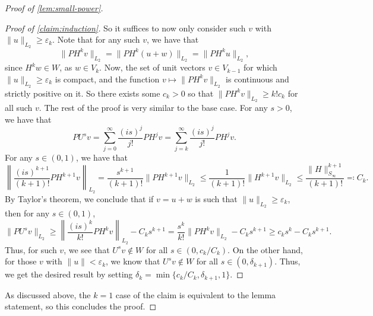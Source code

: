 \documentclass[11pt]{article}
\theoremstyle{plain}
\numberwithin{equation}{section}
\theoremstyle{definition}
\newcommand{\bnorm}[1]{\left\lVert#1\right\rVert}
\newcommand{\norm}[1]{\lVert#1\rVert}
\begin{document}
\begin{proof}[Proof of \cref{lem:small-power}]
\begin{proof}[Proof of \cref{claim:induction}]
        So it suffices to now only consider such $v$ with $\norm u_{L_2} \geq \varepsilon_k$. Note that for any such $v$, we have that 
        \[
            \norm{PH^k v}_{L_2} = \norm{PH^k (u+w)}_{L_2} = \norm{PH^k u}_{L_2},
        \]
        since $H^k w \in W$, as $w \in V_k$. Now, the set of unit vectors $v \in V_{k-1}$ for which $\norm u_{L_2} \geq \varepsilon_k$ is compact, and the function $v \mapsto \norm{PH^k v}_{L_2}$ is continuous and strictly positive on it. So there exists some $c_k>0$ so that $\norm{PH^k v}_{L_2} \geq k! c_k$ for all such $v$.
        The rest of the proof is very similar to the base case. For any $s>0$, we have that
        \[
            PU^sv = \sum_{j=0}^\infty \frac{(is)^j}{j!} PH^j v = \sum_{j=k}^\infty \frac{(is)^j}{j!} PH^j v.
        \]
        For any $s \in (0,1)$, we have that 
        \[
            \bnorm{\frac{(is)^{k+1}}{(k+1)!} PH^{k+1}v}_{L_2} = \frac{s^{k+1}}{(k+1)!} \norm{PH^{k+1}v}_{L_2} \leq \frac{1}{(k+1)!} \norm{H^{k+1}v}_{L_2} \leq \frac{\norm H_{S_\infty}^{k+1}}{(k+1)!}\eqqcolon C_k.
        \]
        By Taylor's theorem, we conclude that if $v=u+w$ is such that $\norm u_{L_2} \geq \varepsilon_k$, then for any $s \in (0,1)$,
        \[
            \norm{PU^s v}_{L_2} \geq \bnorm{\frac{(is)^k}{k!} PH^k v}_{L_2} - C_k s^{k+1} = \frac{s^k}{k!} \norm{PH^k v}_{L_2} - C_k s^{k+1} \geq c_k s^k - C_k s^{k+1}.
        \]
        Thus, for such $v$, we see that $U^s v \notin W$ for all $s \in (0, c_k/C_k)$. On the other hand, for those $v$ with $\norm u<\varepsilon_k$, we know that $U^s v \notin W$ for all $s \in (0,\delta_{k+1})$. Thus, we get the desired result by setting $\delta_k = \min\{c_k/C_k, \delta_{k+1},1\}$.
    \end{proof}
    As discussed above, the $k=1$ case of the claim is equivalent to the lemma statement, so this concludes the proof. 
\end{proof}
\end{document}
